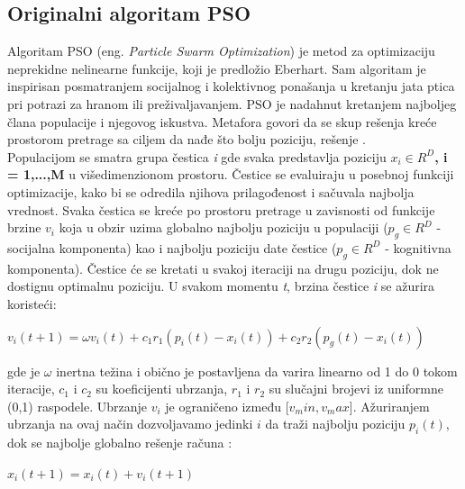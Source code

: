 \documentclass[a4paper]{article}
\begin{document}
{\subsection{Originalni algoritam PSO}
\label{subsec:opso}
Algoritam PSO (eng. \textit{Particle Swarm Optimization}) je metod za optimizaciju neprekidne nelinearne funkcije, koji je predložio Eberhart.
Sam algoritam je inspirisan posmatranjem socijalnog i kolektivnog ponašanja u kretanju jata ptica pri potrazi za hranom ili preživaljavanjem.
PSO je nadahnut kretanjem najboljeg člana populacije i njegovog iskustva. Metafora govori da se skup rešenja kreće prostorom pretrage sa ciljem da nađe što bolju poziciju, rešenje \cite{hindawi}.
\\
Populacijom se smatra grupa čestica \textit{i} gde svaka predstavlja poziciju \textbf{\textbf{$x_i \in R^D$, i = 1,...,M}} u višedimenzionom prostoru.
Čestice se evaluiraju u posebnoj funkciji optimizacije, kako bi se odredila njihova prilagođenost i sačuvala najbolja vrednost. Svaka čestica se kreće po
prostoru pretrage u zavisnosti od funkcije brzine \textbf{$v_i$} koja u obzir uzima globalno najbolju poziciju u populaciji ($p_g \in R^D$ - socijalna
komponenta) kao i najbolju poziciju date čestice ($p_g \in R^D$ - kognitivna komponenta). Čestice će se kretati u svakoj iteraciji na drugu poziciju,
dok ne dostignu optimalnu poziciju. U svakom momentu \textit{t}, brzina čestice \textit{i} se ažurira koristeći: 
\begin{center}
\textbf\textit{$v_i(t+1) = \omega v_i(t) + c_1 r_1(p_i (t) - x_i (t)) + c_2 r_2 (p_g (t) - x_i (t))$}
\end{center}
gde je $\omega$ inertna težina i obično je postavljena da varira linearno od 1 do 0 tokom iteracije, $c_1$ i $c_2$ su koeficijenti ubrzanja, $r_1$ i $r_2$
su slučajni brojevi iz uniformne (0,1) raspodele. Ubrzanje \textbf{$v_i$} je ograničeno između [$v_min, v_max$]. Ažuriranjem ubrzanja na ovaj 
način dozvoljavamo jedinki $i$ da traži najbolju poziciju \textbf{$p_i(t)$}, dok se najbolje globalno rešenje računa \cite{hindawi}:
\begin{center}
\textbf\textit{$x_i(t+1) = x_i(t) + v_i(t+1)$}
\end{center} 



}
\end{document}
